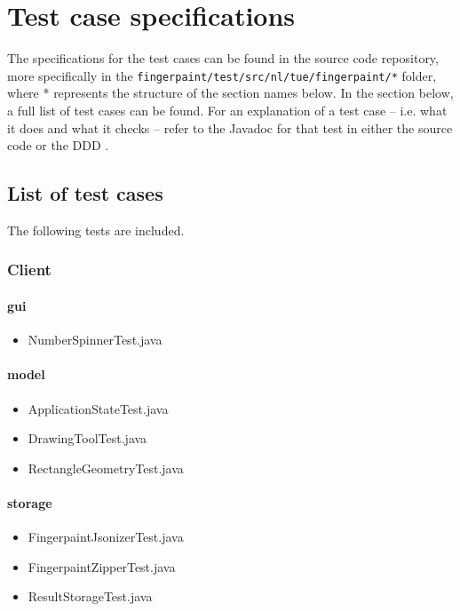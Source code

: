 \chapter{Test case specifications}\label{chap:testcasespec}

The specifications for the test cases can be found in the source code repository, more specifically in the \texttt{fingerpaint/test/src/nl/tue/fingerpaint/*} folder, where * represents the structure of the section names below. In the section below, a full list of test cases can be found. For an explanation of a test case -- i.e. what it does and what it checks -- refer to the Javadoc for that test in either the source code or the DDD \cite{DDD}.

\section{List of test cases}

The following tests are included.

\subsection{Client}
\subsubsection{gui}
\begin{itemize}
\item NumberSpinnerTest.java
\end{itemize}
\subsubsection{model}
\begin{itemize}
\item ApplicationStateTest.java
\item DrawingToolTest.java
\item RectangleGeometryTest.java
\end{itemize}
\subsubsection{storage}
\begin{itemize}
\item FingerpaintJsonizerTest.java
\item FingerpaintZipperTest.java
\item ResultStorageTest.java
\end{itemize}

